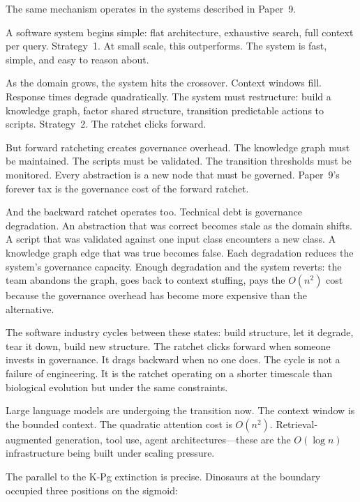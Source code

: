 \documentclass[11pt]{article}
\theoremstyle{definition}
\begin{document}
The same mechanism operates in the systems described in Paper~9.

A software system begins simple: flat architecture, exhaustive
search, full context per query. Strategy~1. At small scale, this
outperforms. The system is fast, simple, and easy to reason about.

As the domain grows, the system hits the crossover. Context windows
fill. Response times degrade quadratically. The system must
restructure: build a knowledge graph, factor shared structure,
transition predictable actions to scripts. Strategy~2. The ratchet
clicks forward.

But forward ratcheting creates governance overhead. The knowledge
graph must be maintained. The scripts must be validated. The
transition thresholds must be monitored. Every abstraction is a
new node that must be governed. Paper~9's forever tax is the
governance cost of the forward ratchet.

And the backward ratchet operates too. Technical debt is governance
degradation. An abstraction that was correct becomes stale as the
domain shifts. A script that was validated against one input class
encounters a new class. A knowledge graph edge that was true becomes
false. Each degradation reduces the system's governance capacity.
Enough degradation and the system reverts: the team abandons the
graph, goes back to context stuffing, pays the $O(n^2)$ cost because
the governance overhead has become more expensive than the
alternative.

The software industry cycles between these states: build structure,
let it degrade, tear it down, build new structure. The ratchet clicks
forward when someone invests in governance. It drags backward when
no one does. The cycle is not a failure of engineering. It is the
ratchet operating on a shorter timescale than biological evolution
but under the same constraints.

Large language models are undergoing the transition now. The context
window is the bounded context. The quadratic attention cost is
$O(n^2)$. Retrieval-augmented generation, tool use, agent
architectures---these are the $O(\log n)$ infrastructure being built
under scaling pressure.

The parallel to the K-Pg extinction is precise. Dinosaurs at the
boundary occupied three positions on the sigmoid:
\end{document}
